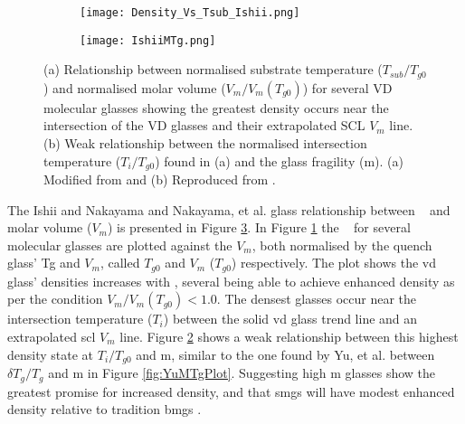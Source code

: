 \documentclass[a4paper,12pt,oneside]{report}%
\begin{document}
\begin{figure}[bp]
	\centering
	\begin{subfigure}[htbp]{0.75\textwidth}
		\texttt{[image: Density\_Vs\_Tsub\_Ishii.png]}
		\caption{}
		\label{fig:IshiiDensityTsub}
	\end{subfigure}
	\begin{subfigure}[htbp]{0.75\textwidth}
		\texttt{[image: IshiiMTg.png]}
		\caption{}
		\label{fig:IshiiMTg}
	\end{subfigure}
	\caption[(a) Relationship between normalised substrate temperature ($T_{sub}/T_{g0}$) and normalised molar volume ($V_{m}/V_{m} (T_{g0})$) for several VD molecular glasses showing the greatest density occurs near the intersection of the VD glasses and their extrapolated SCL $V_{m}$ line. (b) Weak relationship between the normalised intersection temperature ($T_{i}/T_{g0}$) found in (a) and the glass fragility (m).]{(a) Relationship between normalised substrate temperature ($T_{sub}/T_{g0}$) and normalised molar volume ($V_{m}/V_{m} (T_{g0})$) for several VD molecular glasses showing the greatest density occurs near the intersection of the VD glasses and their extrapolated SCL $V_{m}$ line. (b) Weak relationship between the normalised intersection temperature ($T_{i}/T_{g0}$) found in (a) and the glass fragility (m). (a) Modified from \cite{Ishii2014} and (b) Reproduced from \cite{Ishii2014}.}%
	\label{fig:IshiiTsubM}
\end{figure}


The Ishii and Nakayama \cite{Ishii2014} and Nakayama, et al. \cite{Nakayama2013} glass relationship between \Tsub~ and molar volume ($V_{m}$) is presented in Figure \ref{fig:IshiiTsubM}. In Figure \ref{fig:IshiiDensityTsub} the \Tsub~ for several molecular glasses are plotted against the $V_{m}$, both normalised by the quench glass' \gls{Tg} and $V_{m}$, called $T_{g0}$ and $V_{m}$ ($T_{g0}$) respectively. The plot shows the \gls{vd} glass' densities increases with \Tsub, several being able to achieve enhanced density as per the condition $V_{m}/V_{m} (T_{g0})<1.0$. The densest glasses occur near the intersection temperature ($T_{i}$) between the solid \gls{vd} glass trend line and an extrapolated \gls{scl} $V_{m}$ line. Figure \ref{fig:IshiiMTg} shows a weak relationship between this highest density state at $T_{i}/T_{g0}$ and m, similar to the one found by Yu, et al. \cite{Yu2013} between $\delta T_{g}/T_{g}$ and m in Figure \ref{fig:YuMTgPlot}. Suggesting high m glasses show the greatest promise for increased density, and that \glspl{smg} will have modest enhanced density relative to tradition \glspl{bmg} \cite{Ishii2014, Nakayama2013}. 
\end{document}
